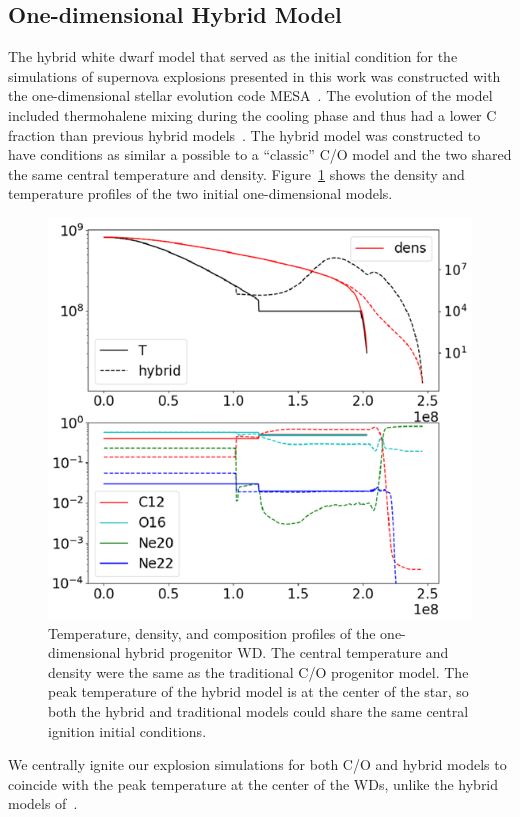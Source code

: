 \documentclass[iop,apj]{emulateapj}
\begin{document}
\subsection{One-dimensional Hybrid Model}

The hybrid white dwarf model that served as the initial condition
for the simulations of supernova explosions presented in this work
was constructed with the one-dimensional stellar evolution code
MESA~\citep{mesa1,mesa2,mesa3,mesa3e}. The evolution of the model
included thermohalene mixing during the cooling phase and thus
had a lower C fraction than previous hybrid models~\citep{brooksetal2017}.
The hybrid model was constructed to have conditions as similar a possible
to a ``classic'' C/O model and the two shared the same central temperature
and density.  Figure~\ref{fig:init_conds} shows the density and temperature
profiles of the two initial one-dimensional models.
\begin{figure}
\includegraphics[width=\columnwidth]{figures/initial_conds.png}
\caption{\label{fig:init_conds}
Temperature, density, and  composition profiles of the one-dimensional hybrid
progenitor WD. The central temperature and density were the same as
the traditional C/O progenitor model.
The peak temperature of the hybrid model is at the center of the star,
so both the hybrid and traditional models could share the same
	central ignition initial conditions.
}
\end{figure}
{\color{blue} We centrally ignite our explosion simulations for both
  C/O and hybrid models to coincide with the peak temperature at the
  center of the WDs, unlike the hybrid models
  of~\citet{willcoxetal2016}.}
\end{document}
